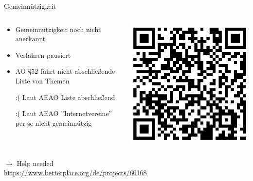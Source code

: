 \begin{frame}{Gemeinnützigkeit}
    \begin{columns}[T]
        \begin{column}{0.6\textwidth}
            \begin{itemize}
                \item Gemeinnützigkeit noch nicht anerkannt
                \item Verfahren pausiert
                \item AO §52 führt nicht abschließende Liste von Themen
                \item[:(] Laut AEAO Liste abschließend
                \item[:(] Laut AEAO ''Internetvereine'' per se nicht gemeinnützig
            \end{itemize}
        \end{column}
        \begin{column}{0.35\textwidth}
            \includegraphics[width=\textwidth]{img/betterplace}
        \end{column}
    \end{columns}

    \vfill

    $\rightarrow$ Help needed\\
    \url{https://www.betterplace.org/de/projects/60168}

    \vfill
\end{frame}

